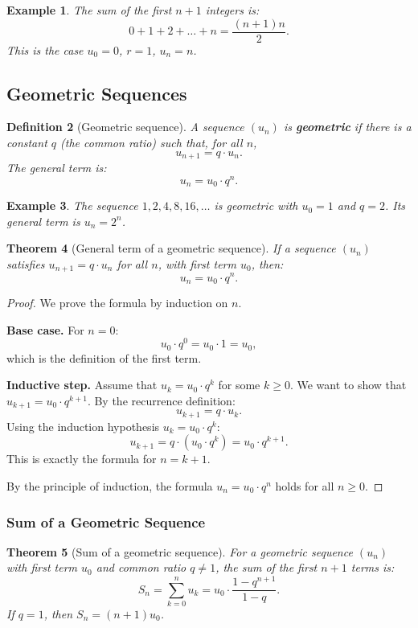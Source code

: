 \documentclass[11pt,a4paper]{article}
\newtheorem{theorem}{Theorem}[section]
\newtheorem{definition}[theorem]{Definition}
\newtheorem{example}[theorem]{Example}
\begin{document}
\begin{example}
The sum of the first $n+1$ integers is:
\[
0 + 1 + 2 + \dots + n = \frac{(n+1)n}{2}.
\]
This is the case $u_0 = 0$, $r = 1$, $u_n = n$.
\end{example}

\subsection{Geometric Sequences}

\begin{definition}[Geometric sequence]
A sequence $(u_n)$ is \textbf{geometric} if there is a constant $q$ (the \emph{common ratio}) such that, for all $n$,
\[
u_{n+1} = q \cdot u_n.
\]
The general term is:
\[
u_n = u_0 \cdot q^n.
\]
\end{definition}

\begin{example}
The sequence $1, 2, 4, 8, 16, \dots$ is geometric with $u_0 = 1$ and $q = 2$. Its general term is $u_n = 2^n$.
\end{example}

\begin{theorem}[General term of a geometric sequence]
If a sequence $(u_n)$ satisfies $u_{n+1} = q \cdot u_n$ for all $n$, with first term $u_0$, then:
\[
u_n = u_0 \cdot q^n.
\]
\end{theorem}

\begin{proof}
We prove the formula by induction on $n$.

\textbf{Base case.} For $n = 0$:
\[
u_0 \cdot q^0 = u_0 \cdot 1 = u_0,
\]
which is the definition of the first term.

\textbf{Inductive step.} Assume that $u_k = u_0 \cdot q^k$ for some $k \geq 0$. We want to show that $u_{k+1} = u_0 \cdot q^{k+1}$. By the recurrence definition:
\[
u_{k+1} = q \cdot u_k.
\]
Using the induction hypothesis $u_k = u_0 \cdot q^k$:
\[
u_{k+1} = q \cdot (u_0 \cdot q^k) = u_0 \cdot q^{k+1}.
\]
This is exactly the formula for $n = k+1$.

By the principle of induction, the formula $u_n = u_0 \cdot q^n$ holds for all $n \geq 0$.
\end{proof}

\subsubsection{Sum of a Geometric Sequence}

\begin{theorem}[Sum of a geometric sequence]
For a geometric sequence $(u_n)$ with first term $u_0$ and common ratio $q \neq 1$, the sum of the first $n+1$ terms is:
\[
S_n = \sum_{k=0}^{n} u_k = u_0 \cdot \frac{1 - q^{n+1}}{1 - q}.
\]
If $q = 1$, then $S_n = (n+1) u_0$.
\end{theorem}
\end{document}
